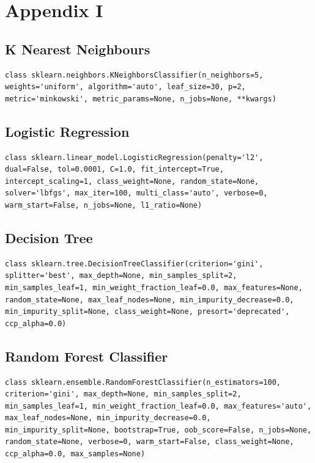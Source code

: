 \documentclass[12pt]{article}
\begin{document}
\newpage
\section{Appendix I}
\subsection{K Nearest Neighbours}
\begin{lstlisting}
class sklearn.neighbors.KNeighborsClassifier(n_neighbors=5, weights='uniform', algorithm='auto', leaf_size=30, p=2, metric='minkowski', metric_params=None, n_jobs=None, **kwargs)
\end{lstlisting}

\subsection{Logistic Regression}
\begin{lstlisting}
class sklearn.linear_model.LogisticRegression(penalty='l2', dual=False, tol=0.0001, C=1.0, fit_intercept=True, intercept_scaling=1, class_weight=None, random_state=None, solver='lbfgs', max_iter=100, multi_class='auto', verbose=0, warm_start=False, n_jobs=None, l1_ratio=None)
\end{lstlisting}

\subsection{Decision Tree}
\begin{lstlisting}
class sklearn.tree.DecisionTreeClassifier(criterion='gini', splitter='best', max_depth=None, min_samples_split=2, min_samples_leaf=1, min_weight_fraction_leaf=0.0, max_features=None, random_state=None, max_leaf_nodes=None, min_impurity_decrease=0.0, min_impurity_split=None, class_weight=None, presort='deprecated', ccp_alpha=0.0)
\end{lstlisting}

\subsection{Random Forest Classifier}
\begin{lstlisting}
class sklearn.ensemble.RandomForestClassifier(n_estimators=100, criterion='gini', max_depth=None, min_samples_split=2, min_samples_leaf=1, min_weight_fraction_leaf=0.0, max_features='auto', max_leaf_nodes=None, min_impurity_decrease=0.0, min_impurity_split=None, bootstrap=True, oob_score=False, n_jobs=None, random_state=None, verbose=0, warm_start=False, class_weight=None, ccp_alpha=0.0, max_samples=None)
\end{lstlisting}
\end{document}
